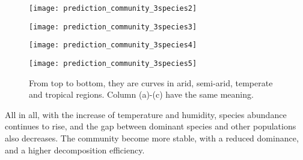 \documentclass{mcmthesis}
\begin{document}
\begin{figure}[H]
  \small
  \centering
  \texttt{[image: prediction\_community\_3species2]}
  \label{prediction_community_3species2}
\end{figure}

\begin{figure}[H]
  \small
  \centering
  \texttt{[image: prediction\_community\_3species3]}
  \label{prediction_community_3species3}
\end{figure}

\begin{figure}[H]
  \small
  \centering
  \texttt{[image: prediction\_community\_3species4]}
  \label{prediction_community_3species4}
\end{figure}

\begin{figure}[H]
  \small
  \centering
  \texttt{[image: prediction\_community\_3species5]}
  \caption{From top to bottom, they are curves in arid, semi-arid, temperate and tropical regions. Column (a)-(c) have the same meaning.}
  \label{prediction_community_3species5}
\end{figure}

All in all, with the increase of temperature and humidity, species abundance continues to rise, and the gap between dominant species and other populations also decreases. The community become more stable, with a reduced dominance, and a higher decomposition efficiency.

\end{document}
